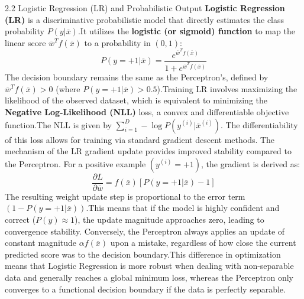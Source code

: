 \documentclass{article}
\begin{document}
2.2 Logistic Regression (LR) and Probabilistic Output
\textbf{Logistic Regression (LR)} is a discriminative probabilistic model that directly estimates the class probability $P(y|\overline{x})$.\footnotemark[1] It utilizes the \textbf{logistic (or sigmoid) function} to map the linear score $\overline{w}^T f(\overline{x})$ to a probability in $(0, 1)$:
$$P(y=+1|\overline{x})=\frac{e^{\overline{w}^{T}f(\overline{x})}}{1+e^{\overline{w}^{T}f(\overline{x})}}$$
The decision boundary remains the same as the Perceptron's, defined by $\overline{w}^T f(\overline{x})>0$ (where $P(y=+1|\overline{x})>0.5$).\footnotemark[1]
Training LR involves maximizing the likelihood of the observed dataset, which is equivalent to minimizing the \textbf{Negative Log-Likelihood (NLL)} loss, a convex and differentiable objective function.\footnotemark[1] The NLL is given by $\sum_{i=1}^{D} -\log P(y^{(i)}|\overline{x}^{(i)})$. The differentiability of this loss allows for training via standard gradient descent methods.
The mechanism of the LR gradient update provides improved stability compared to the Perceptron. For a positive example $(y^{(i)}=+1)$, the gradient is derived as:
$$\frac{\partial L}{\partial \overline{w}} = f(\overline{x})[P(y=+1|\overline{x}) - 1]$$
The resulting weight update step is proportional to the error term $(1-P(y=+1|\overline{x}))$.\footnotemark[1] This means that if the model is highly confident and correct ($P(y)\approx 1$), the update magnitude approaches zero, leading to convergence stability. Conversely, the Perceptron always applies an update of constant magnitude $\alpha f(\overline{x})$ upon a mistake, regardless of how close the current predicted score was to the decision boundary.\footnotemark[1] This difference in optimization means that Logistic Regression is more robust when dealing with non-separable data and generally reaches a global minimum loss, whereas the Perceptron only converges to a functional decision boundary if the data is perfectly separable.
\end{document}
